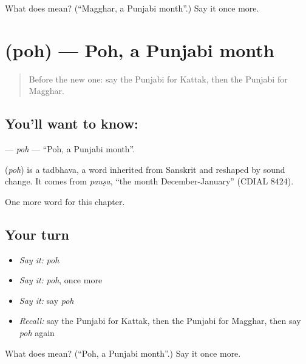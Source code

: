 \begin{tcolorbox}[breakable,colback=teal!4,colframe=teal!35!black,title={Before you move on}]
What does  mean? (\textquotedblleft{}Magghar, a Punjabi month\textquotedblright{}.) Say it once more.
\end{tcolorbox}
\section[\texorpdfstring{\pa{ਪੋਹ} (poh)}{ਪੋਹ (poh)}]{ (poh) — Poh, a Punjabi month}

\label{lesson:PA-C105-poh}



\begin{quote}
Before the new one: say the Punjabi for Kattak, then the Punjabi for Magghar.
\end{quote}

\subsection*{You'll want to know: }
\textbf{} — \emph{poh} — \textquotedblleft{}Poh, a Punjabi month\textquotedblright{}.

\begin{cousinweb}
\textbf{} (\emph{poh}) is a tadbhava, a word inherited from Sanskrit and reshaped by sound change. It comes from \emph{pauṣa}, \textquotedblleft{}the month December-January\textquotedblright{} (CDIAL 8424).
\end{cousinweb}

\begin{grammarlens}[title={What you've built}]
One more word for this chapter.
\end{grammarlens}

\subsection*{Your turn}
\begin{itemize}
\raggedright
  \item \emph{Say it:} \emph{poh}
  \item \emph{Say it:} \emph{poh}, once more
  \item \emph{Say it:} say \emph{poh}
  \item \emph{Recall:} say the Punjabi for Kattak, then the Punjabi for Magghar, then say \emph{poh} again
\end{itemize}

\begin{tcolorbox}[breakable,colback=teal!4,colframe=teal!35!black,title={Before you move on}]
What does  mean? (\textquotedblleft{}Poh, a Punjabi month\textquotedblright{}.) Say it once more.
\end{tcolorbox}
